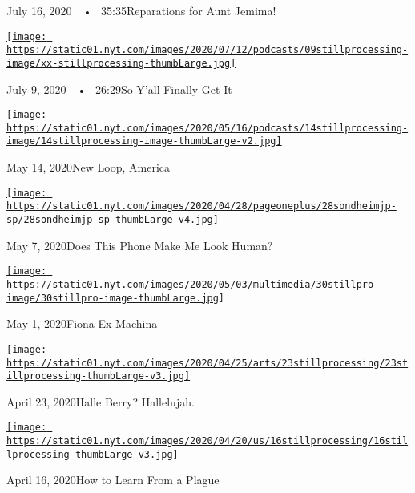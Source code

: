 July 16, 2020~~•~ 35:35Reparations for Aunt Jemima!

\href{https://www.nytimes.com/2020/07/09/podcasts/still-processing-black-lives-matter.html?action=click\&module=audio-series-bar\&region=header\&pgtype=Article}{\texttt{[image: https://static01.nyt.com/images/2020/07/12/podcasts/09stillprocessing-image/xx-stillprocessing-thumbLarge.jpg]}}

July 9, 2020~~•~ 26:29So Y'all Finally Get It

\href{https://www.nytimes.com/2020/05/14/podcasts/still-processing-westworld-hollywood-utopia-dystopia.html?action=click\&module=audio-series-bar\&region=header\&pgtype=Article}{\texttt{[image: https://static01.nyt.com/images/2020/05/16/podcasts/14stillprocessing-image/14stillprocessing-image-thumbLarge-v2.jpg]}}

May 14, 2020New Loop, America

\href{https://www.nytimes.com/2020/05/07/podcasts/still-processing-internet-vulnerability-sondheim-parks-recreation.html?action=click\&module=audio-series-bar\&region=header\&pgtype=Article}{\texttt{[image: https://static01.nyt.com/images/2020/04/28/pageoneplus/28sondheimjp-sp/28sondheimjp-sp-thumbLarge-v4.jpg]}}

May 7, 2020Does This Phone Make Me Look Human?

\href{https://www.nytimes.com/2020/04/30/podcasts/still-processing-fiona-apple-fetch-bolt-cutters.html?action=click\&module=audio-series-bar\&region=header\&pgtype=Article}{\texttt{[image: https://static01.nyt.com/images/2020/05/03/multimedia/30stillpro-image/30stillpro-image-thumbLarge.jpg]}}

May 1, 2020Fiona Ex Machina

\href{https://www.nytimes.com/2020/04/23/podcasts/still-processing-halle-berry-sharon-stone-catwoman-quarantine.html?action=click\&module=audio-series-bar\&region=header\&pgtype=Article}{\texttt{[image: https://static01.nyt.com/images/2020/04/25/arts/23stillprocessing/23stillprocessing-thumbLarge-v3.jpg]}}

April 23, 2020Halle Berry? Hallelujah.

\href{https://www.nytimes.com/2020/04/16/podcasts/still-processing-AIDS-survive-coronavirus.html?action=click\&module=audio-series-bar\&region=header\&pgtype=Article}{\texttt{[image: https://static01.nyt.com/images/2020/04/20/us/16stillprocessing/16stillprocessing-thumbLarge-v3.jpg]}}

April 16, 2020How to Learn From a Plague

